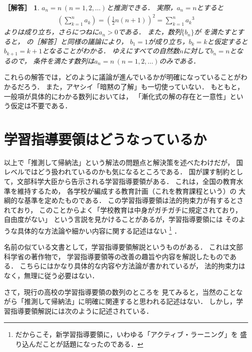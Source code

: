 \documentclass[11pt,a4paper]{ltjsarticle} %
\theoremstyle{mystyle} %
\newtheorem*{ans}{［解答］} %
\begin{document}
\begin{ans}
  $a_n = n \ (n= 1,2, \ldots)$と推測できる．
  実際，$a_n = n$とすると
  \begin{align*}
    \left( \sum_{k=1}^{n} a_k \right) = \left( \frac{1}{2} n(n+1) \right) ^2
    = \sum_{k=1}^{n} {a_k}^3
  \end{align*}
  よりは成り立ち，さらにつねに$a_n > 0$である．
  また，数列$\{ b_n \}$が
  を満たすとすると，
  の［解答］と同様の議論により，
  $b_1=1$が成り立ち，$b_k=k$と仮定すると$b_{k+1} = k+1$となることがわかる．
  ゆえにすべての自然数$n$に対して$b_n=n$となるので，
  条件を満たす数列は$a_n = n \ (n=1,2,\ldots)$のみである．
\end{ans}

これらの解答では，どのように議論が進んでいるかが明確になっていることがわかるだろう．
また，アヤシイ「暗黙の了解」も一切使っていない．
もともと，一般項が具体的にわかる数列においては，
「漸化式の解の存在と一意性」という仮定は不要である．




\section{学習指導要領はどうなっているか}
以上で「推測して帰納法」という解法の問題点と解決策を述べたわけだが，
国レベルではどう扱われているのかも気になるところである．
国が課す制約として，文部科学大臣から告示される学習指導要領がある．
これは，全国の教育水準を維持するため，
各学校が編成する教育計画（これを教育課程という）の
大綱的な基準を定めたものである\cite{monkasyo}．
この学習指導要領は法的拘束力が有するとされており，
このことからよく「学校教育は中身がガチガチに規定されており，自由度がない」
という言説を見かけることがあるが，学習指導要領には
そのような具体的な方法論や細かい内容に関する記述はない
\footnote{
  だからこそ，新学習指導要領に，いわゆる「アクティブ・ラーニング」を
  盛り込んだことが話題になったのである．
}
．

名前の似ている文書として，学習指導要領解説というものがある．
これは文部科学省の著作物で，
学習指導要領等の改善の趣旨や内容を解説したものである\cite{monkasyo}．
こちらにはかなり具体的な内容や方法論が書かれているが，
法的拘束力はなく，無理に従う必要はない．


さて，現行の高校の学習指導要領\cite{youryou}の数列のところを
見てみると，当然のことながら「推測して帰納法」に明確に関連すると思われる記述はない．
しかし，学習指導要領解説\cite{youryoukai}には次のように記述されている．
\end{document}
